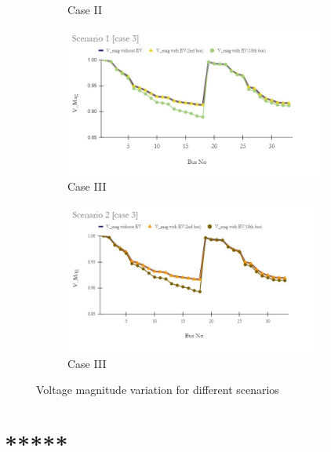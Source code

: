 \begin{figure}[!h]
\begin{subfigure}{.5\textwidth}
			\caption{Case II}
			\label{fig:LF2b}
		\end{subfigure}
		\begin{subfigure}{.5\textwidth}
			\centering
			\includegraphics[width=.97\linewidth,height= 4.95cm]{./Figures/sc1_case3}
			\caption{Case III}
			\label{fig:LFc}
		\end{subfigure}
		\begin{subfigure}{.5\textwidth}
			\centering
			\includegraphics[width=.97\linewidth,height= 4.95cm]{./Figures/sc2_case3}
			\caption{Case III}
			\label{fig:LF2c}
		\end{subfigure}
		\caption{ Voltage magnitude variation for different scenarios }
		\label{fig:loadprofile-scenario1}
	\end{figure} 
	
	

		
	
	\section{*****}
	